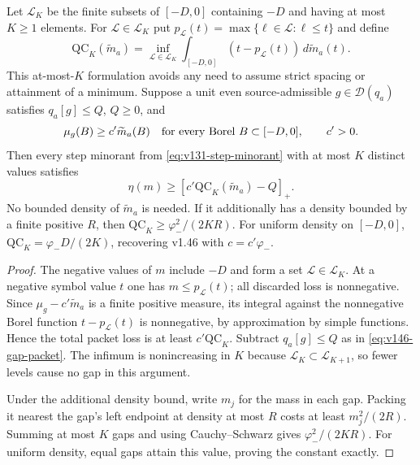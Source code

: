 \begin{proposition}
\label{prop:v149-weighted-cost}
Let $\mathcal L_K$ be the finite subsets of $[-D,0]$ containing $-D$
and having at most $K\ge1$ elements. For $\mathcal L\in\mathcal L_K$
put $p_{\mathcal L}(t)=\max\{\ell\in\mathcal L:\ell\le t\}$ and define
\begin{equation}\label{eq:v149-qc}
 \mathrm{QC}_K(\widetilde m_a)
 =\inf_{\mathcal L\in\mathcal L_K}
       \int_{[-D,0]}(t-p_{\mathcal L}(t))\,d\widetilde m_a(t).
\end{equation}
This at-most-$K$ formulation avoids any need to assume strict spacing
or attainment of a minimum. Suppose a unit even source-admissible
$g\in\mathcal D(q_a)$ satisfies $q_a[g]\le Q$, $Q\ge0$, and
\begin{equation}\label{eq:v149-wlh}
 \mu_g(B)\ge c'\widetilde m_a(B)
 \quad\hbox{for every Borel }B\subset[-D,0],\qquad c'>0.
\end{equation}
Then every step minorant from \eqref{eq:v131-step-minorant} with at most
$K$ distinct values satisfies
\begin{equation}\label{eq:v149-weighted-cost-bound}
 \eta(m)\ge[c'\mathrm{QC}_K(\widetilde m_a)-Q]_+.
\end{equation}
No bounded density of $\widetilde m_a$ is needed. If it additionally has
a density bounded by a finite positive $R$, then
$\mathrm{QC}_K\ge\varphi_-^2/(2KR)$. For uniform density on $[-D,0]$,
$\mathrm{QC}_K=\varphi_-D/(2K)$, recovering v1.46 with $c=c'\varphi_-$.
\end{proposition}
\begin{proof}
The negative values of $m$ include $-D$ and form a set
$\mathcal L\in\mathcal L_K$. At a negative symbol value $t$ one has
$m\le p_{\mathcal L}(t)$; all discarded loss is nonnegative. Since
$\mu_g-c'\widetilde m_a$ is a finite positive measure, its integral
against the nonnegative Borel function $t-p_{\mathcal L}(t)$ is
nonnegative, by approximation by simple functions. Hence the total
packet loss is at least $c'\mathrm{QC}_K$. Subtract $q_a[g]\le Q$ as
in \eqref{eq:v146-gap-packet}. The infimum is nonincreasing in $K$
because $\mathcal L_K\subset\mathcal L_{K+1}$, so fewer levels cause
no gap in this argument.

Under the additional density bound, write $m_j$ for the mass in each
gap. Packing it nearest the gap's left endpoint at density at most
$R$ costs at least $m_j^2/(2R)$. Summing at most $K$ gaps and using
Cauchy--Schwarz gives $\varphi_-^2/(2KR)$. For uniform density, equal
gaps attain this value, proving the constant exactly.
\end{proof}

